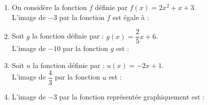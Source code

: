\documentclass[a4paper,11pt]{article}
\begin{document}
\begin{seanceD}{} %

\begin{enumerate}
\item On considère la fonction $f$ définie par $f(x)= 2x^2+x+3$. \\L'image de $-3$ par la fonction $f$ est égale à : \dotfill

\item Soit $g$ la fonction définie par : $g(x)=\dfrac{2}{5}x+6$.\\L'image de $-10$ par la fonction $g$ est : \dotfill

\item Soit $u$ la fonction définie par : $u(x)=-2x+1$.\\L'image de $\dfrac{4}{3}$ par la fonction $u$ est : \dotfill

\item L'image de $-3$ par la fonction représentée graphiquement est : \dotfill
\begin{center}
 \begin{tikzpicture}[baseline,scale = 0.7]


\end{tikzpicture}
\end{center}
\end{enumerate}
\end{seanceD}
\end{document}
